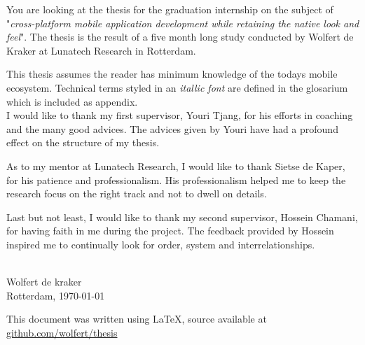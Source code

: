 
You are looking at the thesis for the graduation internship on the subject of "\emph{cross-platform mobile application development while retaining the native look and feel}". The thesis is the result of a five month long study conducted by Wolfert de Kraker at Lunatech Research in Rotterdam.

This thesis assumes the reader has minimum knowledge of the todays mobile ecosystem. Technical terms styled in an \emph{itallic font} are defined in the glosarium which is included as appendix.
~\\

\noindent I would like to thank my first supervisor, Youri Tjang, for his efforts in coaching and the many good advices. The advices given by Youri have had a profound effect on the structure of my thesis.

As to my mentor at Lunatech Research, I would like to thank Sietse de Kaper, for his patience and professionalism. His professionalism helped me to keep the research focus on the right track and not to dwell on details.

Last but not least, I would like to thank my second supervisor, Hossein Chamani, for having faith in me during the project. The feedback provided by Hossein inspired me to continually look for order, system and interrelationships.

~\\

\noindent Wolfert de kraker\\
Rotterdam, \today


\vfill
This document was written using \LaTeX{}, source available at {\url{github.com/wolfert/thesis}}